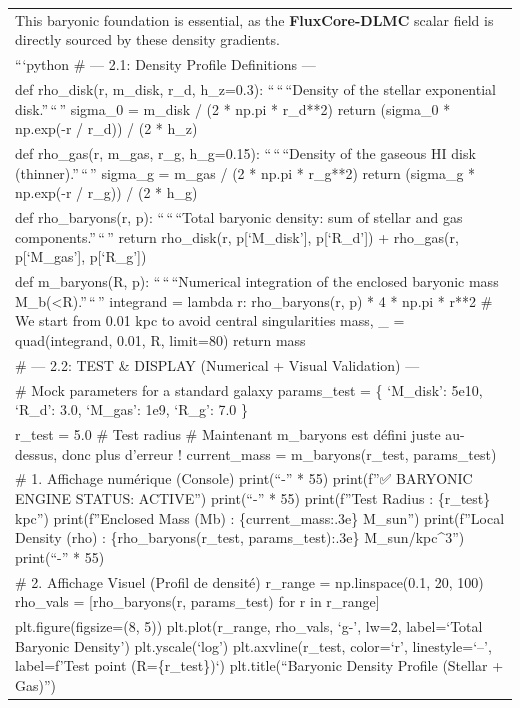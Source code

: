 \documentclass[
]{article}
\begin{document}
{\begin{longtable}[]{@{}
  >{\raggedright\arraybackslash}p{}@{}}
This baryonic foundation is essential, as the \textbf{FluxCore-DLMC}
scalar field is directly sourced by these density gradients. \\
```python \# --- 2.1: Density Profile Definitions --- \\
def rho\_disk(r, m\_disk, r\_d, h\_z=0.3): ``\,``\,``Density of the
stellar exponential disk.''\,``\,'' sigma\_0 = m\_disk / (2 * np.pi *
r\_d**2) return (sigma\_0 * np.exp(-r / r\_d)) / (2 * h\_z) \\
def rho\_gas(r, m\_gas, r\_g, h\_g=0.15): ``\,``\,``Density of the
gaseous HI disk (thinner).''\,``\,'' sigma\_g = m\_gas / (2 * np.pi *
r\_g**2) return (sigma\_g * np.exp(-r / r\_g)) / (2 * h\_g) \\
def rho\_baryons(r, p): ``\,``\,``Total baryonic density: sum of stellar
and gas components.''\,``\,'' return rho\_disk(r, p{[}`M\_disk'{]},
p{[}`R\_d'{]}) + rho\_gas(r, p{[}`M\_gas'{]}, p{[}`R\_g'{]}) \\
def m\_baryons(R, p): ``\,``\,``Numerical integration of the enclosed
baryonic mass M\_b(\textless R).''\,``\,'' integrand = lambda r:
rho\_baryons(r, p) * 4 * np.pi * r**2 \# We start from 0.01 kpc to avoid
central singularities mass, \_ = quad(integrand, 0.01, R, limit=80)
return mass \\
\# --- 2.2: TEST \& DISPLAY (Numerical + Visual Validation) --- \\
\# Mock parameters for a standard galaxy params\_test = \{ `M\_disk':
5e10, `R\_d': 3.0, `M\_gas': 1e9, `R\_g': 7.0 \} \\
r\_test = 5.0 \# Test radius \# Maintenant m\_baryons est défini juste
au-dessus, donc plus d'erreur ! current\_mass = m\_baryons(r\_test,
params\_test) \\
\# 1. Affichage numérique (Console) print(``-'' * 55) print(f''✅
BARYONIC ENGINE STATUS: ACTIVE'') print(``-'' * 55) print(f''Test Radius
: \{r\_test\} kpc'') print(f''Enclosed Mass (Mb) : \{current\_mass:.3e\}
M\_sun'') print(f''Local Density (rho) : \{rho\_baryons(r\_test,
params\_test):.3e\} M\_sun/kpc\^{}3'') print(``-'' * 55) \\
\# 2. Affichage Visuel (Profil de densité) r\_range = np.linspace(0.1,
20, 100) rho\_vals = {[}rho\_baryons(r, params\_test) for r in
r\_range{]} \\
plt.figure(figsize=(8, 5)) plt.plot(r\_range, rho\_vals, `g-', lw=2,
label=`Total Baryonic Density') plt.yscale(`log') plt.axvline(r\_test,
color=`r', linestyle=`--', label=f'Test point (R=\{r\_test\})`)
plt.title(``Baryonic Density Profile (Stellar + Gas)'')

\end{longtable}}
\end{document}
